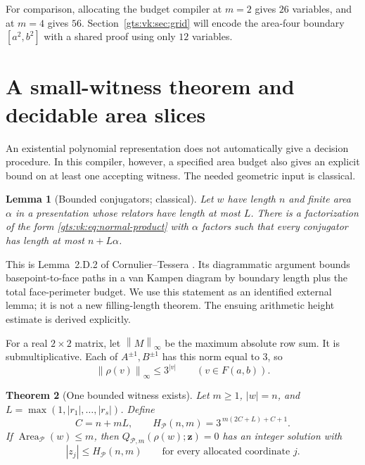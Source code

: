 \documentclass[11pt,letterpaper]{article}
\newtheorem{theorem}{Theorem}[section]
\newtheorem{lemma}[theorem]{Lemma}
\theoremstyle{definition}
\theoremstyle{remark}
\newcommand{\Pp}{\mathcal P}
\newcommand{\F}{F(a,b)}
\newcommand{\Area}{\operatorname{Area}}
\newcommand{\norm}[1]{\left\lVert #1\right\rVert}
\begin{document}
For comparison, allocating the budget compiler at $m=2$ gives $26$ variables, and at $m=4$ gives $56$. Section~\ref{gts:vk:sec:grid} will encode the area-four boundary $[a^2,b^2]$ with a shared proof using only $12$ variables.

\section{A small-witness theorem and decidable area slices}\label{gts:vk:sec:height}

An existential polynomial representation does not automatically give a decision procedure. In this compiler, however, a specified area budget also gives an explicit bound on at least one accepting witness. The needed geometric input is classical.

\begin{lemma}[Bounded conjugators; classical]\label{gts:vk:lem:conjugators}
Let $w$ have length $n$ and finite area $\alpha$ in a presentation whose relators have length at most $L$. There is a factorization of the form \eqref{gts:vk:eq:normal-product} with $\alpha$ factors such that every conjugator has length at most $n+L\alpha$.
\end{lemma}

This is Lemma~2.D.2 of Cornulier--Tessera \cite{cornulier}. Its diagrammatic argument bounds basepoint-to-face paths in a van Kampen diagram by boundary length plus the total face-perimeter budget. We use this statement as an identified external lemma; it is not a new filling-length theorem. The ensuing arithmetic height estimate is derived explicitly.

For a real $2\times2$ matrix, let $\norm{M}_\infty$ be the maximum absolute row sum. It is submultiplicative. Each of $A^{\pm1},B^{\pm1}$ has this norm equal to $3$, so
\begin{equation}\label{gts:vk:eq:word-norm}
 \norm{\rho(v)}_\infty\leq3^{|v|}
 \qquad(v\in\F).
\end{equation}

\begin{theorem}[One bounded witness exists]\label{gts:vk:thm:height}
Let $m\geq1$, $|w|=n$, and $L=\max(1,|r_1|,\ldots,|r_s|)$. Define
\begin{equation}\label{gts:vk:eq:height}
 C=n+mL,\qquad
 H_{\Pp}(n,m)=3^{\,m(2C+L)+C+1}.
\end{equation}
If $\Area_{\Pp}(w)\leq m$, then $Q_{\Pp,m}(\rho(w);\boldsymbol z)=0$ has an integer solution with
\begin{equation}\label{gts:vk:eq:height-bound}
 |z_j|\leq H_{\Pp}(n,m)\qquad\text{for every allocated coordinate }j.
\end{equation}
\end{theorem}
\end{document}
